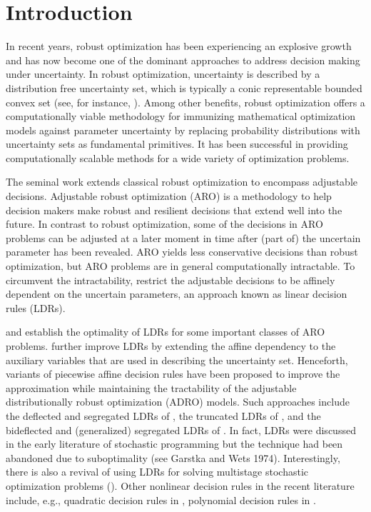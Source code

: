 \documentclass[fleqn,mnsc,blindrev]{informs4}
\begin{document}
\maketitle
	
\section{Introduction}
\noindent In recent years, robust optimization has been experiencing an explosive growth and has now become one of the dominant approaches to address decision making under uncertainty. In robust optimization, uncertainty is described by a distribution free uncertainty set, which is typically a conic representable bounded convex set (see, for instance, \cite{gl97,gol98,bn98,bn99,bn00,bs04,bb09,bbc11}). Among other benefits, robust optimization offers a computationally viable methodology for immunizing mathematical optimization models against parameter uncertainty by\vadjust{\pagebreak} replacing probability distributions with uncertainty sets as fundamental primitives. It has been successful in providing computationally scalable methods for a wide variety of optimization problems. 
	
	The seminal work \cite{bggn04} extends classical robust optimization to encompass adjustable decisions.  {Adjustable robust optimization (ARO) is a methodology to help decision makers make robust and resilient decisions that extend well into the future. In contrast to robust optimization, some of the decisions in ARO problems can be adjusted at a later moment in time after (part of) the uncertain parameter has been revealed. ARO yields less conservative decisions than robust optimization, but ARO problems} are in general computationally intractable. To circumvent the intractability, \cite{bggn04} restrict the adjustable decisions to be affinely dependent on the uncertain parameters, an approach known as linear decision rules (LDRs). 
	
	\cite{bip10,iss13} and \cite{bg12} establish the optimality of LDRs for some important classes of ARO problems. \cite{cz09} further improve LDRs by extending the affine dependency to the auxiliary variables that are used in describing the uncertainty set. Henceforth, variants of piecewise affine decision rules have been proposed to improve the approximation while maintaining the tractability of the adjustable distributionally robust optimization (ADRO) models. Such approaches include the deflected and segregated LDRs of \cite{cssz08}, the truncated LDRs of \cite{ss09}, and the bideflected and (generalized) segregated LDRs of \cite{gs10}. In fact, LDRs were discussed in the early literature of stochastic programming but the technique had been abandoned due to suboptimality (see Garstka and Wets 1974). Interestingly, there is also a revival of using LDRs for solving multistage stochastic optimization problems (\cite{kwg11}). Other nonlinear decision rules in the recent literature include, e.g., quadratic decision rules in \cite{ben09}, polynomial decision rules in \cite{bip11}.
	
\end{document}
